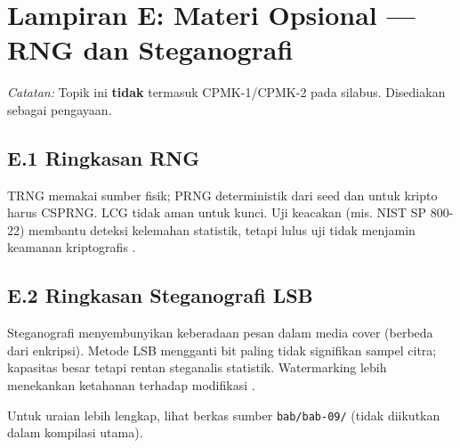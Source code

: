 \documentclass[main.tex]{subfiles}
\begin{document}
\section*{Lampiran E: Materi Opsional --- RNG dan Steganografi}

\noindent\textit{Catatan:} Topik ini \textbf{tidak} termasuk CPMK-1/CPMK-2 pada silabus. Disediakan sebagai pengayaan.

\subsection*{E.1 Ringkasan RNG}
TRNG memakai sumber fisik; PRNG deterministik dari seed dan untuk kripto harus CSPRNG. LCG tidak aman untuk kunci. Uji keacakan (mis. NIST SP 800-22) membantu deteksi kelemahan statistik, tetapi lulus uji tidak menjamin keamanan kriptografis \cite{stallings2017,menezes1996}.

\subsection*{E.2 Ringkasan Steganografi LSB}
Steganografi menyembunyikan keberadaan pesan dalam media cover (berbeda dari enkripsi). Metode LSB mengganti bit paling tidak signifikan sampel citra; kapasitas besar tetapi rentan steganalis statistik. Watermarking lebih menekankan ketahanan terhadap modifikasi \cite{stallings2017}.

\noindent Untuk uraian lebih lengkap, lihat berkas sumber \texttt{bab/bab-09/} (tidak diikutkan dalam kompilasi utama).
\end{document}
